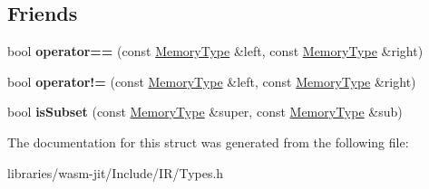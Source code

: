 \subsection*{Friends}
\begin{DoxyCompactItemize}
\item 
\mbox{\label{struct_i_r_1_1_memory_type_ab33b480d139b2ea704387197aa091d06}} 
bool {\bfseries operator==} (const \mbox{\hyperlink{struct_i_r_1_1_memory_type}{Memory\+Type}} \&left, const \mbox{\hyperlink{struct_i_r_1_1_memory_type}{Memory\+Type}} \&right)
\item 
\mbox{\label{struct_i_r_1_1_memory_type_ab29921da3355cfaa07885bc89d877cb0}} 
bool {\bfseries operator!=} (const \mbox{\hyperlink{struct_i_r_1_1_memory_type}{Memory\+Type}} \&left, const \mbox{\hyperlink{struct_i_r_1_1_memory_type}{Memory\+Type}} \&right)
\item 
\mbox{\label{struct_i_r_1_1_memory_type_a93a8714ea89f7139788b658e0c3fc4de}} 
bool {\bfseries is\+Subset} (const \mbox{\hyperlink{struct_i_r_1_1_memory_type}{Memory\+Type}} \&super, const \mbox{\hyperlink{struct_i_r_1_1_memory_type}{Memory\+Type}} \&sub)
\end{DoxyCompactItemize}


The documentation for this struct was generated from the following file\+:\begin{DoxyCompactItemize}
\item 
libraries/wasm-\/jit/\+Include/\+I\+R/Types.\+h\end{DoxyCompactItemize}
